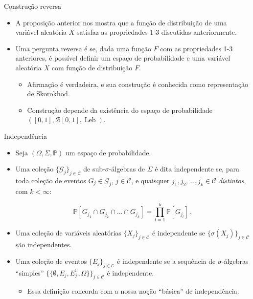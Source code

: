 \documentclass[11pt]{beamer}
\begin{document}
\begin{frame}{Construção reversa}
\begin{itemize}
	\item A proposição anterior nos mostra que a função de distribuição de uma variável aleatória $X$ satisfaz as propriedades 1-3 discutidas anteriormente.
	\item Uma pergunta reversa é se, dada uma função $F$ com as propriedades 1-3 anteriores, é possível definir um espaço de probabilidade e uma variável aleatória $X$ com função de distribuição $F$.
	\begin{itemize}
		\item Afirmação é verdadeira, e sua construção é conhecida como {\color{blue}representação de Skorokhod}.
		\item Construção depende da existência do espaço de probabilidade $([0,1],\mathcal{B}[0,1], \operatorname{Leb})$.
	\end{itemize}
\end{itemize}
\end{frame}
\begin{frame}{Independência}
	\begin{itemize}
		\item Seja $(\Omega, \Sigma,\mathbb{P})$ um espaço de probabilidade.
		\item Uma coleção $\{\mathcal{G}_j\}_{j \in \mathcal{C}}$ de sub-$\sigma$-álgebras de $\Sigma$ é dita independente se, para toda coleção de eventos $G_j \in \mathcal{G}_j$, $j \in \mathcal{C}$, e quaisquer $j_1, j_2, \ldots, j_k \in \mathcal{C}$ \emph{distintos}, com $k < \infty$:
		
		$$\mathbb{P}[G_{j_1}\cap G_{j_2}\cap \ldots \cap G_{j_k}] = \prod_{l=1}^k \mathbb{P}[G_{j_l}]\, ,$$
		\item Uma coleção de variáveis aleatórias $\{{X}_j \}_{j \in \mathcal{C}}$ é independente se $\{\sigma(X_j)\}_{j \in \mathcal{C}}$ são independentes.
		\item Uma coleção de eventos $\{E_j\}_{j\in \mathcal{C}}$ é independente se a sequência de $\sigma$-álgebras ``simples''   $\{\{\emptyset, E_j, E_j^{\complement},\Omega\}\}_{j\in \mathcal{C}}$ é independente.
		\begin{itemize}
			\item Essa definição concorda com a nossa noção ``básica'' de independência.
		\end{itemize}
	\end{itemize}
\end{frame}
\end{document}
